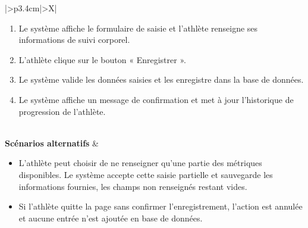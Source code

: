 ﻿\documentclass[a4paper,12pt]{report}
\begin{document}
\begin{table}[H]
\begin{tabularx}{\textwidth}{|>{\RaggedRight\arraybackslash}p{3.4cm}|>{\RaggedRight\arraybackslash}X|}
\begin{minipage}[t]{\linewidth}
\begin{enumerate}[label=\arabic*., leftmargin=*, topsep=0pt, itemsep=1pt]
    \item Le système affiche le formulaire de saisie et l’athlète renseigne ses informations de suivi corporel.
    \item L’athlète clique sur le bouton « Enregistrer ».
    \item Le système valide les données saisies et les enregistre dans la base de données.
    \item Le système affiche un message de confirmation et met à jour l’historique de progression de l’athlète.
\end{enumerate}
\vspace{2pt}
\end{minipage} \\
\hline
\textbf{Scénarios alternatifs} &
\begin{minipage}[t]{\linewidth}
\vspace{2pt}
\begin{itemize}[leftmargin=*, topsep=0pt, itemsep=1pt]
    \item  L'athlète peut choisir de ne renseigner qu'une partie des métriques disponibles. Le système accepte cette saisie partielle et sauvegarde les informations fournies, les champs non renseignés restant vides.
    \item Si l'athlète quitte la page sans confirmer l'enregistrement, l'action est annulée et aucune entrée n'est ajoutée en base de données.
\end{itemize}
\vspace{2pt}
\end{minipage} \\
\hline
\end{tabularx}
\fussy
\end{table}
\end{document}
